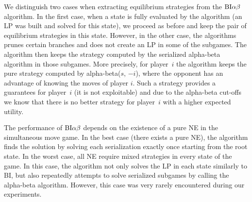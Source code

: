 We distinguish two cases when extracting equilibrium strategies from the $\textrm{BI}\alpha\beta$ algorithm. %
In the first case, when a state is fully evaluated by the algorithm (\ie an LP was built and solved for this state),
we proceed as before and keep the pair of equilibrium strategies in this state.
However, in the other case, the algorithms prunes certain branches and does not create an LP in some of the subgames.
The algorithm then keeps the strategy computed by the serialized alpha-beta algorithm in those subgames.
More precisely, for player~$i$ the algorithm keeps the pure strategy computed by alpha-beta($s$, $-i$), where the opponent has an advantage of knowing the moves of player $i$.
Such a strategy provides a guarantees for player~$i$ (it is not exploitable) and due to the alpha-beta cut-offs we know that there is no better strategy for player~$i$ with a higher expected utility.


The performance of $\textrm{BI}\alpha\beta$ depends on the existence of a pure NE in the simultaneous move game.
In the best case (\ie there exists a pure NE), the algorithm finds the solution by solving each serialization exactly once starting from the root state.
In the worst case, all NE require mixed strategies in every state of the game.
In this case, the algorithm not only solves the LP in each state similarly to BI, but also repeatedly attempts to solve serialized subgames by calling the alpha-beta algorithm.
However, this case was very rarely encountered during our experiments.


